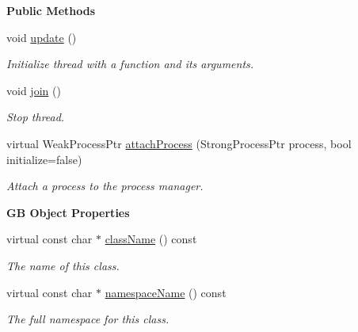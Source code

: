 \begin{Indent}\textbf{ Public Methods}\par
\begin{DoxyCompactItemize}
\item 
void \mbox{\hyperlink{classrev_1_1_process_thread_a24e0793126ea3c5935c62a3034dbdca1}{update}} ()
\begin{DoxyCompactList}\small\item\em Initialize thread with a function and its arguments. \end{DoxyCompactList}\item 
\mbox{\label{classrev_1_1_process_thread_a195f5c531ae573016492e5e1e606a827}} 
void \mbox{\hyperlink{classrev_1_1_process_thread_a195f5c531ae573016492e5e1e606a827}{join}} ()
\begin{DoxyCompactList}\small\item\em Stop thread. \end{DoxyCompactList}\item 
\mbox{\label{classrev_1_1_process_thread_a69578823369da4ecbc7fa12691317d2e}} 
virtual Weak\+Process\+Ptr \mbox{\hyperlink{classrev_1_1_process_thread_a69578823369da4ecbc7fa12691317d2e}{attach\+Process}} (Strong\+Process\+Ptr process, bool initialize=false)
\begin{DoxyCompactList}\small\item\em Attach a process to the process manager. \end{DoxyCompactList}\end{DoxyCompactItemize}
\end{Indent}
\begin{Indent}\textbf{ GB Object Properties}\par
\begin{DoxyCompactItemize}
\item 
virtual const char $\ast$ \mbox{\hyperlink{classrev_1_1_process_thread_a61ecc9b8d9234f25418adee22c062874}{class\+Name}} () const
\begin{DoxyCompactList}\small\item\em The name of this class. \end{DoxyCompactList}\item 
virtual const char $\ast$ \mbox{\hyperlink{classrev_1_1_process_thread_a9a5cd59371fc8c768364dc355b6351d0}{namespace\+Name}} () const
\begin{DoxyCompactList}\small\item\em The full namespace for this class. \end{DoxyCompactList}\end{DoxyCompactItemize}
\end{Indent}
